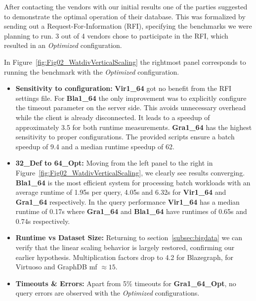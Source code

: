 %

After contacting the vendors with our initial results one of the parties suggested to demonstrate the optimal operation of their database. 
This was formalized by sending out a Request-For-Information (RFI), specifying the benchmarks we were planning to run.
3 out of 4 vendors chose to participate in the RFI, which resulted in an \emph{Optimized} configuration. 

In Figure~\ref{fig:Fig02_WatdivVerticalScaling} the rightmost panel corresponds to running the benchmark with the \emph{Optimized} configuration.

%
%
%
\begin{itemize}
	\item \textbf{Sensitivity to configuration:} \textbf{Vir1\_64} got no benefit from the RFI settings file. For 
	\textbf{Bla1\_64} the only improvement was to explicitly configure the timeout parameter on the server side. This avoids unnecessary overhead while the client is already disconnected. It leads to a speedup of approximately 3.5 for both runtime measurements. \textbf{Gra1\_64} has the highest sensitivity to proper configurations. The provided scripts ensure a batch speedup of 9.4 and a median runtime speedup of 62.
	\item \textbf{32\_Def to 64\_Opt:} Moving from the left panel to the right in Figure~\ref{fig:Fig02_WatdivVerticalScaling}, we clearly see results converging. \textbf{Bla1\_64} is the most efficient system for processing batch workloads with an average runtime of 1.95s per query, 4.05s and 6.32s for \textbf{Vir1\_64} and \textbf{Gra1\_64} respectively. In the query performance \textbf{Vir1\_64} has a median runtime of 0.17s where \textbf{Gra1\_64} and \textbf{Bla1\_64} have runtimes of 0.65s and 0.74s respectively.
	\item \textbf{Runtime vs Dataset Size:} Returning to section~\ref{subsec:bigdata} we can verify that the linear scaling behavior is largely restored, confirming our earlier hypothesis. Multiplication factors drop to 4.2 for Blazegraph, for Virtuoso and GraphDB mf $ \approx 15$.
\item \textbf{Timeouts \& Errors:} Apart from 5\% timeouts for \textbf{Gra1\_64\_Opt}, no query errors are observed with the \emph{Optimized} configurations.
\end{itemize}

